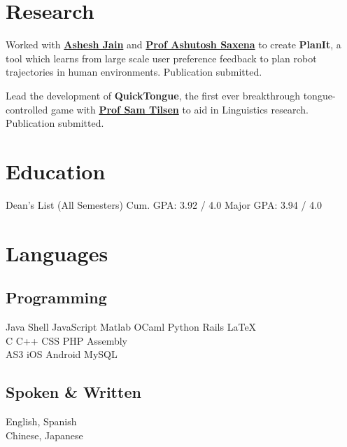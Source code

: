 \documentclass[]{deedy-resume-openfont}
\begin{document}

\section{Research}
Worked with \textbf{\href{http://www.cs.cornell.edu/~ashesh/}{Ashesh Jain}} and \textbf{\href{http://www.cs.cornell.edu/~asaxena/}{Prof Ashutosh Saxena}} to create \textbf{PlanIt}, a tool which  learns from large scale user preference feedback to plan robot trajectories in human environments.  Publication submitted.
\sectionsep

Lead the development of \textbf{QuickTongue}, the first ever breakthrough tongue-controlled game with \textbf{\href{http://conf.ling.cornell.edu/~tilsen/}{Prof Sam Tilsen}} to aid in Linguistics research. Publication submitted.
\sectionsep

\section{Education}
\sectionsep

Dean's List (All Semesters) \textbullet{}
Cum. GPA: 3.92 / 4.0 \textbullet{}
Major GPA: 3.94 / 4.0
\sectionsep

\section{Languages}
\begin{minipage}[t]{.6\textwidth}
\subsection{Programming}
Java \textbullet{}   Shell \textbullet{} JavaScript \textbullet{} Matlab \textbullet{}
OCaml \textbullet{} Python \textbullet{} Rails \textbullet{} \LaTeX\ \\ 
C \textbullet{} C++ \textbullet{} CSS \textbullet{} PHP \textbullet{} Assembly \\
AS3 \textbullet{} iOS \textbullet{} Android \textbullet{} MySQL
\sectionsep
\end{minipage}
\hfill
\begin{minipage}[t]{.35\textwidth}
\subsection{Spoken \& Written}
 English, Spanish\\
 Chinese, Japanese\\
\end{minipage}
\end{document}
